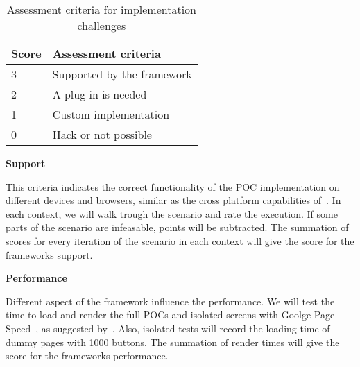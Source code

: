 \documentclass[a4paper]{artikel3}
\renewcommand{\paragraph}[1]{{\bf #1} }
\begin{document}
\begin{table}[h]
\centering
\begin{tabular}{l|l}
\textbf{Score} & \textbf{Assessment criteria}\\
  \hline \hline
3 & Supported by the framework\\
2 & A plug in is needed\\
1 & Custom implementation\\
0 & Hack or not possible\\
\end{tabular}
\caption{Assessment criteria for implementation challenges}
\label{table:challenges-scores}
\end{table}

\paragraph{Support}%

This criteria indicates the correct functionality of the POC implementation on different devices and browsers,  similar as the cross platform capabilities of~\cite{Sarrafi2012a}.  In each context,  we will walk trough the scenario and rate the execution.  If some parts of the scenario are infeasable,  points will be subtracted.  The summation of scores for every iteration of the scenario in each context will give the score for the frameworks support.

\paragraph{Performance}%

Different aspect of the framework influence the performance.  We will test the time to load and render the full POCs and isolated screens with Goolge Page Speed~\cite{Google2012},  as suggested by~\cite{Morgan2011}.   Also,  isolated tests will record the loading time of dummy pages with 1000 buttons.  The summation of render times will give the score for the frameworks performance.
\end{document}
